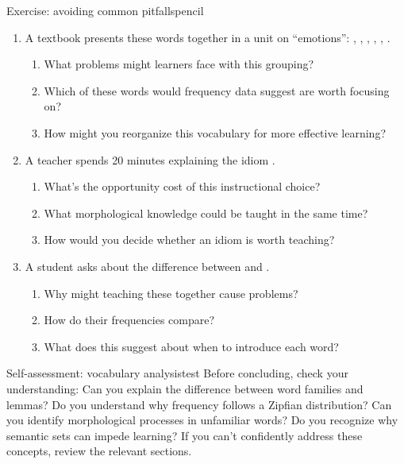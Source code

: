\begin{tblsframedsymbol}{Exercise: avoiding common pitfalls}{pencil}
\begin{enumerate}[noitemsep, leftmargin=*]
    \item A textbook presents these words together in a unit on \enquote{emotions}: , , , , , .
    \begin{enumerate}[nosep]
        \item What problems might learners face with this grouping?
        \item Which of these words would frequency data suggest are worth focusing on?
        \item How might you reorganize this vocabulary for more effective learning?
    \end{enumerate}

    \item A teacher spends 20 minutes explaining the idiom .
    \begin{enumerate}[nosep]
        \item What's the opportunity cost of this instructional choice?
        \item What morphological knowledge could be taught in the same time?
        \item How would you decide whether an idiom is worth teaching?
    \end{enumerate}

    \item A student asks about the difference between  and .
    \begin{enumerate}[nosep]
        \item Why might teaching these together cause problems?
        \item How do their frequencies compare?
        \item What does this suggest about when to introduce each word?
    \end{enumerate}
\end{enumerate}
\end{tblsframedsymbol}

\begin{tblsframedsymbol}{Self-assessment: vocabulary analysis}{test}
Before concluding, check your understanding: Can you explain the difference between word families and lemmas? Do you understand why frequency follows a Zipfian distribution? Can you identify morphological processes in unfamiliar words? Do you recognize why semantic sets can impede learning? If you can't confidently address these concepts, review the relevant sections.
\end{tblsframedsymbol}

